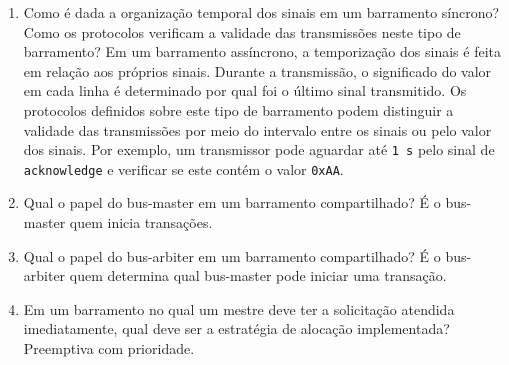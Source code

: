 \documentclass{article}
\begin{document}
\begin{enumerate}
\item Como é dada a organização temporal dos sinais em um barramento síncrono? Como os protocolos verificam a validade das transmissões neste tipo de barramento? Em um barramento assíncrono, a temporização dos sinais é feita em relação aos próprios sinais. Durante a transmissão, o significado do valor em cada linha é determinado por qual foi o último sinal transmitido. Os protocolos definidos sobre este tipo de barramento podem distinguir a validade das transmissões por meio do intervalo entre os sinais ou pelo valor dos sinais. Por exemplo, um transmissor pode aguardar até \texttt{1 s} pelo sinal de \texttt{acknowledge} e verificar se este contém o valor \texttt{0xAA}.

\item Qual o papel do bus-master em um barramento compartilhado? É o bus-master quem inicia transações.

\item Qual o papel do bus-arbiter em um barramento compartilhado? É o bus-arbiter quem determina qual bus-master pode iniciar uma transação.

\item Em um barramento no qual um mestre deve ter a solicitação atendida imediatamente, qual deve ser a estratégia de alocação implementada? Preemptiva com prioridade.

\end{enumerate}
\end{document}
